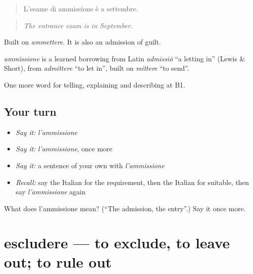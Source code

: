 \begin{quote}
L'esame di ammissione è a settembre.
\end{quote}

\begin{quote}
\emph{The entrance exam is in September.}
\end{quote}

Built on \emph{ammettere}. It is also an admission of guilt.

\begin{cousinweb}
\emph{ammissione} is a learned borrowing from Latin \emph{admissiō} \textquotedblleft{}a letting in\textquotedblright{} (Lewis \& Short), from \emph{admittere} \textquotedblleft{}to let in\textquotedblright{}, built on \emph{mittere} \textquotedblleft{}to send\textquotedblright{}.
\end{cousinweb}

\begin{grammarlens}[title={What you've built}]
One more word for telling, explaining and describing at B1.
\end{grammarlens}

\subsection*{Your turn}
\begin{itemize}
\raggedright
  \item \emph{Say it:} \emph{l'ammissione}
  \item \emph{Say it:} \emph{l'ammissione}, once more
  \item \emph{Say it:} a sentence of your own with \emph{l'ammissione}
  \item \emph{Recall:} say the Italian for the requirement, then the Italian for suitable, then say \emph{l'ammissione} again
\end{itemize}

\begin{tcolorbox}[breakable,colback=teal!4,colframe=teal!35!black,title={Before you move on}]
What does l'ammissione mean? (\textquotedblleft{}The admission, the entry\textquotedblright{}.) Say it once more.
\end{tcolorbox}
\section[escludere]{escludere — to exclude, to leave out; to rule out}

\label{lesson:IT-C387-escludere}



